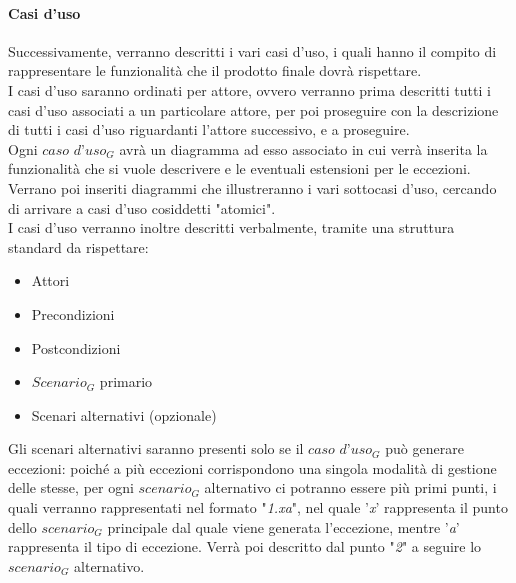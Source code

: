 \paragraph{Casi d'uso}
Successivamente, verranno descritti i vari casi d'uso, i quali hanno il compito di rappresentare le funzionalità che il prodotto finale dovrà rispettare. \\
I casi d'uso saranno ordinati per attore, ovvero verranno prima descritti tutti i casi d'uso associati a un particolare attore, per poi proseguire con la descrizione di tutti i casi d'uso riguardanti l'attore successivo, e a proseguire. \\
Ogni $\textit{caso d'uso}_G$ avrà un diagramma ad esso associato in cui verrà inserita la funzionalità che si vuole descrivere e le eventuali estensioni per le eccezioni. Verrano poi inseriti diagrammi che illustreranno i vari sottocasi d'uso, cercando di arrivare a casi d'uso cosiddetti "atomici". \\
I casi d'uso verranno inoltre descritti verbalmente, tramite una struttura standard da rispettare:
\begin{itemize}
    \item Attori
    \item Precondizioni
    \item Postcondizioni
    \item $\textit{Scenario}_G$ primario
    \item Scenari alternativi (opzionale)
\end{itemize}
\begin{comment}
I sottocasi d'uso non verranno descritti individualmente, poiché sarà già tutto descritto a livello atomico nello $\textit{scenario}_G$ principale del relativo $\textit{caso d'uso}_G$ "padre".
\end{comment}
Gli scenari alternativi saranno presenti solo se il $\textit{caso d'uso}_G$ può generare eccezioni: poiché a più eccezioni corrispondono una singola modalità di gestione delle stesse, per ogni $\textit{scenario}_G$ alternativo ci potranno essere più primi punti, i quali verranno rappresentati nel formato "\textit{1.xa}", nel quale '\textit{x}' rappresenta il punto dello $\textit{scenario}_G$ principale dal quale viene generata l'eccezione, mentre '\textit{a}' rappresenta il tipo di eccezione. Verrà poi descritto dal punto "\textit{2}" a seguire lo $\textit{scenario}_G$ alternativo.
